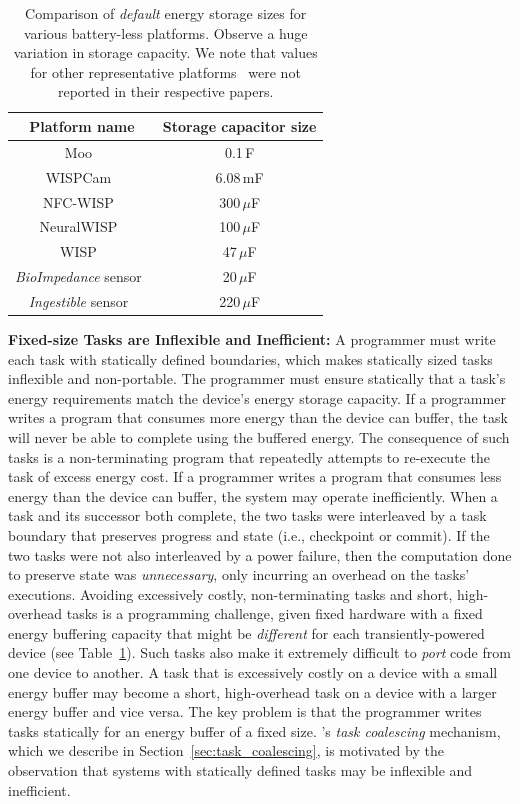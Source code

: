 \begin{table}
	\centering
	\footnotesize
	\begin{tabular}{|c|c|}
		\hline
		Platform name & Storage capacitor size \\
		\hline \hline
		Moo~\cite{moo} & 0.1\,F \\
		WISPCam~\cite{naderiparizi_rfid_2015} & 6.08\,mF \\ %
		NFC-WISP~\cite{zhao_rfid_2015} & 300\,$\mu$F \\
		NeuralWISP~\cite{holleman_biocas_2008} & 100\,$\mu$F \\
		WISP~\cite{wisp5} & 47\,$\mu$F \\
		{\em BioImpedance} sensor~\cite{rodriguez_tbcs_2015} & 20\,$\mu$F \\
		{\em Ingestible} sensor~\cite{nadeau_naturebio_2017} & 220\,$\mu$F\\
		\hline
	\end{tabular} 
	\caption{Comparison of {\em default} energy storage sizes for various battery-less platforms. Observe a huge variation in storage capacity. We note that values for other representative platforms~\cite{medusa_farsens_2017,talla_imwut_2017,liu_sigcomm_2013,parks_sigcomm_2014} were not reported in their respective papers.}
	\label{table:capacitor}
\end{table}

\noindent \textbf{Fixed-size Tasks are Inflexible and Inefficient:} A programmer must write each task with statically defined boundaries, which makes statically sized tasks inflexible and non-portable. The programmer must ensure statically that a task's energy requirements match the device's energy storage capacity. If a programmer writes a program that consumes more energy than the device can buffer, the task will never be able to complete using the buffered energy. The consequence of such tasks is a non-terminating program that repeatedly attempts to re-execute the task of excess energy cost. If a programmer writes a program that consumes less energy than the device can buffer, the system may operate inefficiently. When a task and its successor both complete, the two tasks were interleaved by a task boundary that preserves progress and state (i.e., checkpoint or commit).  If the two tasks were not also interleaved by a power failure, then the computation done to preserve state was {\em unnecessary}, only incurring an overhead on the tasks' executions. Avoiding excessively costly, non-terminating tasks and short, high-overhead tasks is a programming challenge, given fixed hardware with a fixed energy buffering capacity that might be \emph{different} for each transiently-powered device (see Table~\ref{table:capacitor}). Such tasks also make it extremely difficult to {\em port} code from  one device to another. A task that is excessively costly on a device with a small energy buffer may become a short, high-overhead task on a device with a larger energy buffer and vice versa. The key problem is that the programmer writes tasks statically for an energy buffer of a fixed size. \sys's {\em task coalescing} mechanism, which we describe in Section~\ref{sec:task_coalescing}, is motivated by the observation that systems with statically defined tasks may be inflexible and inefficient. 

